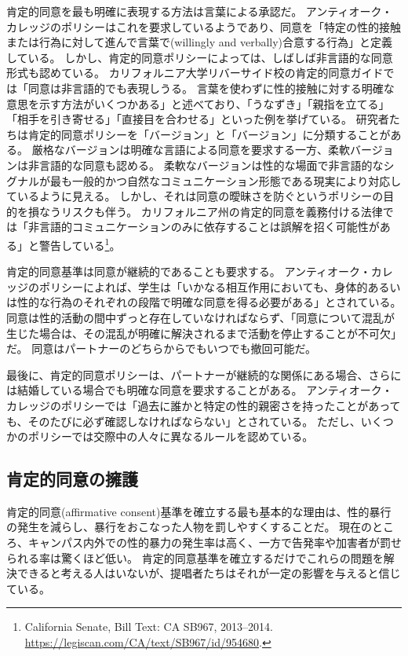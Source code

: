 \documentclass[paper=a4,book,openany]{jlreq}
\newcommand{\ig}[1]{}           %
\begin{document}
肯定的同意を最も明確に表現する方法は言葉による承認だ。
アンティオーク・カレッジのポリシーはこれを要求しているようであり、同意を「特定の性的接触または行為に対して進んで言葉で(willingly and verbally)合意する行為」と定義している\citep{college25:_sexual_offen_preven_polic}。
しかし、肯定的同意ポリシーによっては、しばしば非言語的な同意形式も認めている。
カリフォルニア大学リバーサイド校の肯定的同意ガイドでは「同意は非言語的でも表現しうる。
言葉を使わずに性的接触に対する明確な意思を示す方法がいくつかある」と述べており、「うなずき」「親指を立てる」「相手を引き寄せる」「直接目を合わせる」といった例を挙げている\citep{university25:_what_is_consen}。
研究者たちは肯定的同意ポリシーを「バージョン」と「バージョン」に分類することがある。
厳格なバージョンは明確な言語による同意を要求する一方、柔軟バージョンは非言語的な同意も認める。
柔軟なバージョンは性的な場面で非言語的なシグナルが最も一般的かつ自然なコミュニケーション形態である現実により対応しているように見える。
しかし、それは同意の曖昧さを防ぐというポリシーの目的を損なうリスクも伴う。
カリフォルニア州の肯定的同意を義務付ける法律では「非言語的コミュニケーションのみに依存することは誤解を招く可能性がある」と警告している\footnote{California Senate, Bill Text: CA SB967, 2013--2014. \url{https://legiscan.com/CA/text/SB967/id/954680}.}。

肯定的同意基準は同意が継続的であることも要求する。
アンティオーク・カレッジのポリシーによれば、学生は「いかなる相互作用においても、身体的あるいは性的な行為のそれぞれの段階で明確な同意を得る必要がある」とされている\ig{\footnote{Antioch College.}}。
同意は性的活動の間中ずっと存在していなければならず、「同意について混乱が生じた場合は、その混乱が明確に解決されるまで活動を停止することが不可欠」だ。
同意はパートナーのどちらからでもいつでも撤回可能だ\ig{\footnote{Antioch College.}}。

最後に、肯定的同意ポリシーは、パートナーが継続的な関係にある場合、さらには結婚している場合でも明確な同意を要求することがある。
アンティオーク・カレッジのポリシーでは「過去に誰かと特定の性的親密さを持ったことがあっても、そのたびに必ず確認しなければならない」とされている。
ただし、いくつかのポリシーでは交際中の人々に異なるルールを認めている。

\subsection{肯定的同意の擁護}

肯定的同意(affirmative consent)基準を確立する最も基本的な理由は、性的暴行の発生を減らし、暴行をおこなった人物を罰しやすくすることだ。
現在のところ、キャンパス内外での性的暴力の発生率は高く、一方で告発率や加害者が罰せられる率は驚くほど低い。
肯定的同意基準を確立するだけでこれらの問題を解決できると考える人はいないが、提唱者たちはそれが一定の影響を与えると信じている。
\end{document}
